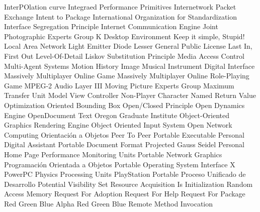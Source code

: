 {\begin{acronym}[XXXXXXXX]
    {InterPOlation curve}
    {Integraed Performance Primitives}
    {Internetwork Packet Exchange} 
    {Intent to Package}
    {International Organization for Standardization} 
    {Interface Segregation Principle}
    {Internet Communication Engine}
    {Joint Photographic Experts Group} 
    {K Desktop Environment} 
   {Keep it simple, Stupid!}
    {Local Area Network}
    {Light Emitter Diode}
   {Lesser General Public License}
   {Last In, First Out}
    {Level-Of-Detail}
    {Liskov Substitution Principle}
    {Media Access Control} 
    {Multi-Agent Systems}
    {Motion History Image}
   {Musical Instrument Digital Interface}
   {Massively Multiplayer Online Game}
 {Massively Multiplayer Online Role-Playing Game}
    {\acs{MPEG}-2 Audio Layer III}
   {Moving Picture Experts Group}
    {Maximum Transfer Unit}
    {Model View Controller}
    {Non-Player Character}
   {Named Return Value Optimization}
    {Oriented Bounding Box}
    {Open/Closed Principle}
    {Open Dynamics Engine}
    {OpenDocument Text}
    {Oregon Graduate Institute}
   {Object-Oriented Graphics Rendering Engine}
    {Object Oriented Input System}
    {Open Network Computing}
     {Orientación a Objetos}
    {Peer To Peer}
     {Portable Executable}
    {Personal Digital Assistant}
    {Portable Document Format}
    {Projected Gauss Seidel}
    {Personal Home Page} 
    {Performance Monitoring Units}
    {Portable Network Graphics} 
    {Programación Orientada a Objetos}
  {Portable Operating System Interface X} 
    {PowerPC} 
    {Physics Processing Units}
    {PlayStation Portable} 
    {Proceso Unificado de Desarrollo}
    {Potential Visibility Set}
   {Resource Acquisition Is Initialization}
    {Random Access Memory}
    {Request For Adoption}
    {Request For Help}
    {Request For Package}
   {Red Green Blue Alpha}
    {Red Green Blue}
    {Remote Method Invocation}

\end{acronym}}
